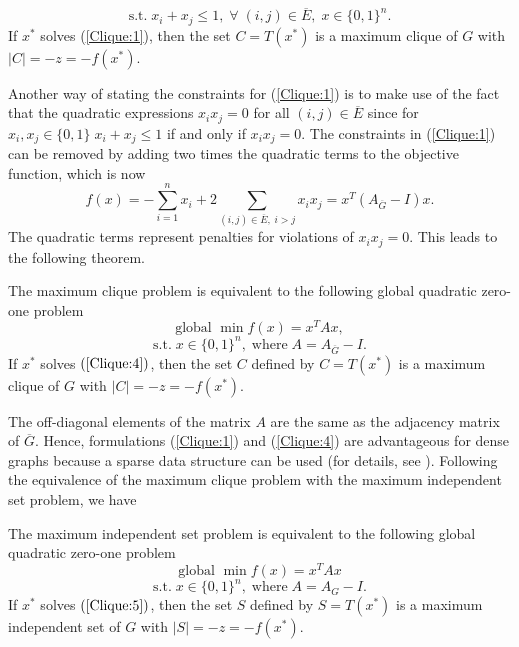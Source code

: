 \[ \mbox{s.t.} \; {x}_{i} + {x}_{j} \leq 1, \;
 \forall \; (i,j) \in \overline{E}, \; x \in { \{ 0, 1 \} }^{n}. \]
If ${x}^{*}$ solves (\ref{Clique:1}), then the set $C = T(x^{*})$ is
a maximum clique of $G$ with $|C| = -z = - f({x}^{*})$.

Another way of stating the constraints for (\ref{Clique:1}) is to
make use of the fact that the quadratic expressions
${x}_{i} {x}_{j} = 0$ for all $(i,j) \in \overline{E}$ since for
${x}_{i} , {x}_{j} \in { \{ 0,1 \} } \; {x}_{i} + {x}_{j} \leq 1$ if
and only if ${x}_{i} {x}_{j} =0 $. The constraints in
(\ref{Clique:1}) can be removed by adding two times the quadratic
terms to the objective function, which is now
\[ f(x) = - \sum_{i=1}^{n}{ {x}_{i} } +
 2 \sum_{ (i,j) \in \overline{E}, \; i > j }
 {x}_{i} {x}_{j} = {x}^{T} ( A_{\overline{G}} - I ) x. \]
The quadratic terms represent penalties for violations of
${x}_{i} {x}_{j} = 0$. This leads to the following theorem.

\begin{thm}
The maximum clique problem is equivalent to the following global
quadratic zero-one problem
\begin{equation}
\mbox{global } \min f(x) = {x}^{T} Ax,
	\label{Clique:4}
\end{equation}
\[ \mbox{s.t.} \; x \in { \{ 0,1 \} }^{n}, \;
 \mbox{where} \; A = {A}_{ \overline{G} } - I. \]
If ${x}^{*}$ solves $(\ref{Clique:4})$, then the set $C$ defined
by $C = T(x^{*})$ is a maximum clique of $G$ with
$|C| = -z = -f({x}^{*})$.
	\label{thm21}
\end{thm}

The off-diagonal elements of the matrix $A$ are the same as the
adjacency matrix of $\overline{G}$. Hence, formulations
(\ref{Clique:1}) and (\ref{Clique:4}) are advantageous for dense
graphs because a sparse data structure can be used (for details, see
\cite{PaRo90.2}). Following the equivalence of the maximum clique
problem with the maximum independent set problem, we have

\begin{thm}
The maximum independent set problem is equivalent to the following
global quadratic zero-one problem
\begin{equation}
\mbox{global } \min {f(x) = {x}^{T} Ax}
	\label{Clique:5}
\end{equation}
\[ \mbox{s.t.} \; x \in { \{ 0,1 \} }^{n}, \;
 \mbox{where} \; A = {A}_{G} - I. \]
If ${x}^{*}$ solves $(\ref{Clique:5})$, then the set $S$ defined
by $S = T(x^{*})$ is a maximum independent set of $G$ with
$|S| = -z = - f({x}^{*})$. 


	\label{thm22}
\end{thm}

